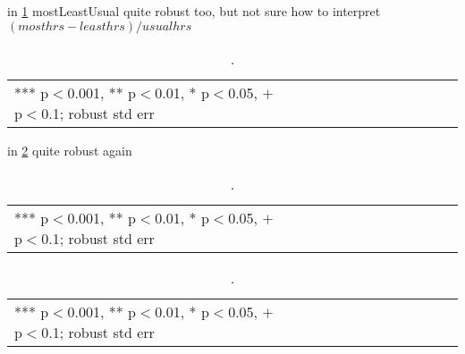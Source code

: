 \documentclass[10pt, letterpaper]{article}
\begin{document}
\begin{spacing}{1.4}
in \ref{mlu1} mostLeastUsual quite robust too, but not sure how to interpret $(mosthrs-leasthrs)/usualhrs$


\begin{spacing}{.9}
  \begin{table}[H]\centering \caption{.} \label{mlu1} \begin{scriptsize} \begin{tabular}{p{1.8in}p{.5in}p{.5in}p{.5in}p{.5in}p{.5in}p{.5in}p{.5in}p{.5in}p{.5in}p{.5
            in}p{.5in}p{.5 in}}\hline
        
\hline  *** p$<$0.001, ** p$<$0.01, * p$<$0.05, $+$ p$<$0.1; robust std err
         \end{tabular}\end{scriptsize}\end{table}
\end{spacing}

in \ref{as1} quite robust again

\begin{spacing}{.9}
  \begin{table}[H]\centering \caption{.} \label{as1} \begin{scriptsize} \begin{tabular}{p{1.8in}p{.5in}p{.5in}p{.5in}p{.5in}p{.5in}p{.5in}p{.5in}p{.5in}p{.5in}p{.5
            in}p{.5in}p{.5 in}}\hline
        
\hline  *** p$<$0.001, ** p$<$0.01, * p$<$0.05, $+$ p$<$0.1; robust std err
         \end{tabular}\end{scriptsize}\end{table}
\end{spacing}


\begin{spacing}{.9}
  \begin{table}[H]\centering \caption{.} \label{d1} \begin{scriptsize} \begin{tabular}{p{1.8in}p{.5in}p{.5in}p{.5in}p{.5in}p{.5in}p{.5in}p{.5in}p{.5in}p{.5in}p{.5
            in}p{.5in}p{.5 in}}\hline
        
\hline  *** p$<$0.001, ** p$<$0.01, * p$<$0.05, $+$ p$<$0.1; robust std err
         \end{tabular}\end{scriptsize}\end{table}
\end{spacing}








\end{spacing}
\end{document}
